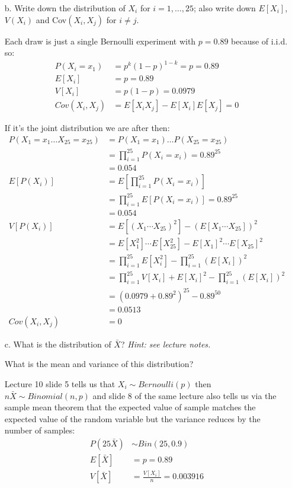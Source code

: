 \documentclass{article}
\newcommand{\1}{\mathbf{1}}
\begin{document}
\begin{itemize} 
    \item[b.] Write down the distribution of $X_i$ for $i=1,\ldots ,25$; also write down $E[X_i]$, $V(X_i)$ and Cov$(X_i,X_j)$ for $i\neq j$.
    
    Each draw is just a single Bernoulli experiment with $p=0.89$ because of i.i.d. so:
    \begin{align*}
        P(X_i=x_1) &= p^k(1-p)^{1-k} = p = 0.89 \\
        E[X_i] &= p = 0.89 \\
        V[X_i] &= p(1-p) = 0.0979 \\
        Cov(X_i, X_j) &= E[X_iX_j] - E[X_i]E[X_j] = 0
    \end{align*}
    
    If it's the joint distribution we are after then:
    \begin{align*}
        P(X_1=x_1 \hdots X_{25}=x_{25}) &= P(X_1=x_1)\hdots P(X_{25}=x_{25}) \\
        &= \prod_{i=1}^{25} P(X_i=x_i) = 0.89^{25} \\
        &= 0.054 \\
        E[P(X_i)] &= E\left[ \prod_{i=1}^{25} P(X_i=x_i)\right] \\
        &= \prod_{i=1}^{25} E[P(X_i=x_i)] = 0.89^{25} \\
        &= 0.054 \\
        V[P(X_i)] &= E[ (X_1\cdots X_{25})^2 ] - \left( E[ X_1\cdots X_{25} ] \right)^2 \\
        &= E[X_1^2] \cdots E[X_{25}^2] - E[X_1]^2 \cdots E[X_{25}]^2 \\
        &= \prod_{i=1}^{25} E[X_i^2] - \prod_{i=1}^{25} (E[X_i])^2 \\
        &= \prod_{i=1}^{25} V[X_i] + E[X_i]^2  - \prod_{i=1}^{25} (E[X_i])^2 \\
        &= (0.0979 + 0.89^2)^{25} - 0.89^{50} \\
        &= 0.0513 \\
        Cov(X_i, X_j) &= 0
    \end{align*}
    

    \item[c.] What is the distribution of $\bar{X}$? {\it Hint: see lecture notes.}\par
    What is the mean and variance of this distribution?
    
    Lecture 10 slide 5 tells us that $X_i\sim Bernoulli(p)$ then $n\bar X \sim Binomial(n, p)$ and slide 8 of the same lecture also tells us via the sample mean theorem that the expected value of sample matches the expected value of the random variable but the variance reduces by the number of samples:
    \begin{align*}
        P(25\bar X) &\sim Bin(25, 0.9) \\
        E[\bar X] &= p = 0.89 \\
        V[\bar X] &= \frac{V[X_i]}{n} = 0.003916 \\
    \end{align*}
    

\end{itemize}
\end{document}
